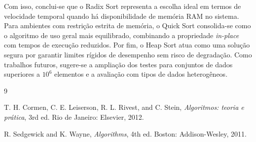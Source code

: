 \documentclass[12pt,a4paper]{article}
\begin{document}
Com isso, conclui-se que o Radix Sort representa a escolha ideal em termos de velocidade temporal quando há disponibilidade de memória RAM no sistema. Para ambientes com restrição estrita de memória, o Quick Sort consolida-se como o algoritmo de uso geral mais equilibrado, combinando a propriedade \textit{in-place} com tempos de execução reduzidos. Por fim, o Heap Sort atua como uma solução segura por garantir limites rígidos de desempenho sem risco de degradação. Como trabalhos futuros, sugere-se a ampliação dos testes para conjuntos de dados superiores a $10^6$ elementos e a avaliação com tipos de dados heterogêneos.

\begin{thebibliography}{9}

T. H. Cormen, C. E. Leiserson, R. L. Rivest, and C. Stein, \textit{Algoritmos: teoria e prática}, 3rd ed. Rio de Janeiro: Elsevier, 2012.

R. Sedgewick and K. Wayne, \textit{Algorithms}, 4th ed. Boston: Addison-Wesley, 2011.

\end{thebibliography}
\end{document}
